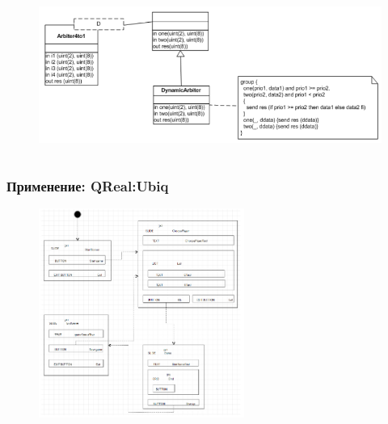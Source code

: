\documentclass[14pt]{beamer}
\begin{document}
\begin{frame}
\begin{columns}[onlytextwidth]
\begin{column}{0.65\textwidth}
\begin{figure}
\begin{center}
             		\vspace{0.5cm}\includegraphics[width=\textwidth]{images/presentation/hascol2.png}
            	\end{center}
            \end{figure}
        \end{column}
    \end{columns}
\end{frame}

\begin{frame}
    \frametitle{Применение: QReal:Ubiq}
    \begin{figure}
       	\begin{center}
        	\includegraphics[width=0.6\textwidth]{images/presentation/ubiq.png}
       	\end{center}
    \end{figure}
\end{frame}
\end{document}
